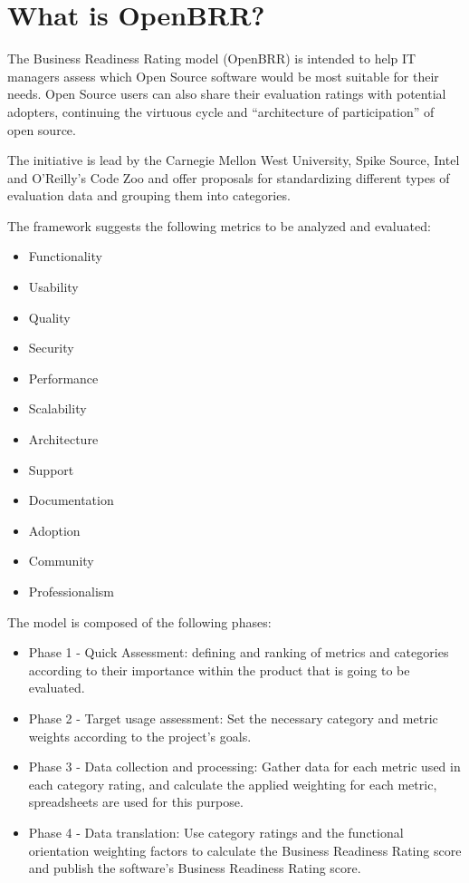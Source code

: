 \documentclass[a4paper,12pt]{book}
\begin{document}
\section{What is OpenBRR?}
\label{sec:openbrr2}

The Business Readiness Rating model (OpenBRR)\cite{OpenBRRWhitepaper} is
intended to help IT managers assess which Open Source software would be most suitable for their needs. Open Source users can also share their evaluation ratings with potential adopters, continuing the virtuous cycle and “architecture of participation” of open
source.

The initiative is lead by the Carnegie Mellon West University, Spike Source,
Intel and O’Reilly’s Code Zoo and offer proposals for standardizing different
types of evaluation data and grouping them into categories.

The framework suggests the following metrics to be analyzed and evaluated:
\begin{itemize}
\item Functionality
\item Usability
\item Quality
\item Security
\item Performance
\item Scalability
\item Architecture
\item Support
\item Documentation
\item Adoption
\item Community
\item Professionalism
\end{itemize}

The model is composed of the following phases:
\begin{itemize}
\item Phase 1 - Quick Assessment: defining and ranking of metrics and categories
according to their importance within the product that is going to be evaluated.
\item Phase 2 - Target usage assessment: Set the necessary category and metric
weights according to the project's goals.
\item Phase 3 - Data collection and processing: Gather data for each metric used
in each category rating, and calculate the applied weighting for each metric,
spreadsheets are used for this purpose.
\item Phase 4 - Data translation: Use category ratings and the functional
orientation weighting factors to calculate the Business Readiness Rating score
and publish the software’s Business Readiness Rating score.
\end{itemize}
\end{document}
